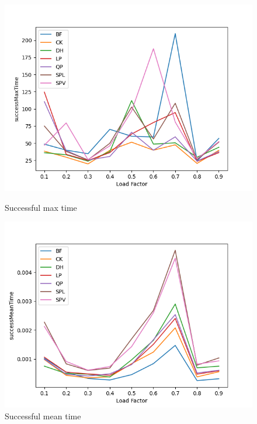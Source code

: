 \documentclass{article}
\begin{document}
        \begin{figure}[!h]
          \includegraphics[width=\linewidth]{images/loadFactor_vs_successMaxTime.png}
          \caption{Successful max time}\label{fig:plot2}
        \endminipage\hfill
          \includegraphics[width=\linewidth]{images/loadFactor_vs_successMeanTime.png}
          \caption{Successful mean time}\label{fig:plot3}
        \endminipage
        \end{figure}
    
\end{document}
